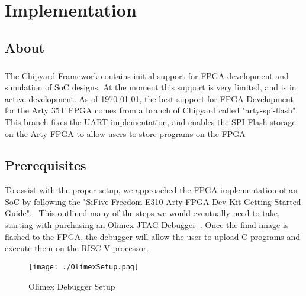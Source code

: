 \chapter{\texorpdfstring{}{FPGA} Implementation}\label{chap:FPGA_Implementation}

\section{About}\label{sec:About}
\paragraph{}The Chipyard Framework contains initial support for FPGA development and simulation of SoC designs. 
At the moment this support is very limited, and is in active development. 
As of \today, the best support for FPGA Development for the Arty 35T FPGA comes from a branch of Chipyard called "arty-spi-flash". 
This branch fixes the UART implementation, and enables the SPI Flash storage on the Arty FPGA to allow users to store programs on the FPGA


\section{Prerequisites}\label{sec:Prerequisites}
To assist with the proper setup, we approached the FPGA implementation of an SoC by following the "SiFive Freedom E310 Arty FPGA Dev Kit Getting Started Guide".~\cite{FreedomDevGuide}
This outlined many of the steps we would eventually need to take, starting with purchasing an \href{https://www.digikey.com/en/products/detail/olimex-ltd/ARM-USB-TINY-H/3471388}{Olimex JTAG Debugger}~\cite{OlimexJTAG}. 
Once the final image is flashed to the FPGA, the debugger will allow the user to upload C programs and execute them on the RISC-V processor. 

\begin{figure}[h!tbp]
  \centering
  \texttt{[image: ./OlimexSetup.png]}
  \caption{Olimex Debugger Setup~\cite[p.~5]{FreedomDevGuide}}
  \label{fig:olimexsetup}
\end{figure}



